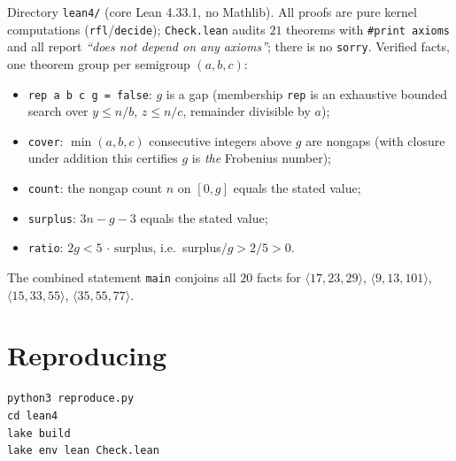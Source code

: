 \documentclass[11pt]{article}
\newcommand{\Sg}[1]{\langle #1\rangle}
\begin{document}
Directory \texttt{lean4/} (core Lean 4.33.1, no Mathlib). All proofs are pure
kernel computations (\texttt{rfl}/\texttt{decide}); \texttt{Check.lean} audits
$21$ theorems with \texttt{\#print axioms} and all report \emph{``does not depend
on any axioms''}; there is no \texttt{sorry}. Verified facts, one theorem group per
semigroup $(a,b,c)$:
\begin{itemize}
\item \texttt{rep a b c g = false}: $g$ is a gap (membership \texttt{rep} is an
exhaustive bounded search over $y \le n/b$, $z \le n/c$, remainder divisible by $a$);
\item \texttt{cover}: $\min(a,b,c)$ consecutive integers above $g$ are nongaps
(with closure under addition this certifies $g$ is \emph{the} Frobenius number);
\item \texttt{count}: the nongap count $n$ on $[0,g]$ equals the stated value;
\item \texttt{surplus}: $3n - g - 3$ equals the stated value;
\item \texttt{ratio}: $2g < 5\,\cdot\,\text{surplus}$, i.e.\ surplus$/g > 2/5 > 0$.
\end{itemize}
The combined statement \texttt{main} conjoins all $20$ facts for
$\Sg{17,23,29}$, $\Sg{9,13,101}$, $\Sg{15,33,55}$, $\Sg{35,55,77}$.

\section{Reproducing}

\begin{verbatim}
python3 reproduce.py
cd lean4
lake build
lake env lean Check.lean
\end{verbatim}
\end{document}
